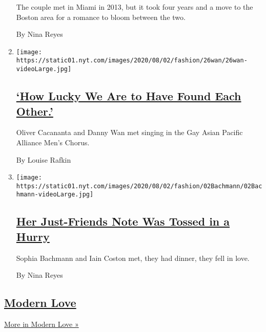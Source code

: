 \begin{enumerate}
  The couple met in Miami in 2013, but it took four years and a move to
  the Boston area for a romance to bloom between the two.

  By Nina Reyes
\item
  \texttt{[image: https://static01.nyt.com/images/2020/08/02/fashion/26wan/26wan-videoLarge.jpg]}

  \hypertarget{how-lucky-we-are-to-have-found-each-other}{%
  \subsection{\texorpdfstring{\href{/2020/07/31/fashion/weddings/how-lucky-we-are-to-have-found-each-other.html}{`How
  Lucky We Are to Have Found Each
  Other.'}}{`How Lucky We Are to Have Found Each Other.'}}\label{how-lucky-we-are-to-have-found-each-other}}

  Oliver Cacananta and Danny Wan met singing in the Gay Asian Pacific
  Alliance Men's Chorus.

  By Louise Rafkin
\item
  \texttt{[image: https://static01.nyt.com/images/2020/08/02/fashion/02Bachmann/02Bachmann-videoLarge.jpg]}

  \hypertarget{her-just-friends-note-was-tossed-in-a-hurry}{%
  \subsection{\texorpdfstring{\href{/2020/07/31/fashion/weddings/her-just-friends-note-was-tossed-in-a-hurry.html}{Her
  Just-Friends Note Was Tossed in a
  Hurry}}{Her Just-Friends Note Was Tossed in a Hurry}}\label{her-just-friends-note-was-tossed-in-a-hurry}}

  Sophia Bachmann and Iain Coston met, they had dinner, they fell in
  love.

  By Nina Reyes
\end{enumerate}

\hypertarget{modern-love}{%
\subsection{\texorpdfstring{\href{/column/modern-love}{Modern
Love}}{Modern Love}}\label{modern-love}}

\href{/column/modern-love}{More in Modern Love »}

